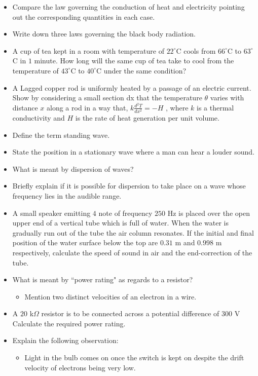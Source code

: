 \documentclass{article}
\begin{document}
\begin{itemize}
\item Compare the law governing the conduction of heat and electricity pointing out the corresponding quantities in each case.
\item Write down three laws governing the black body radiation.
\item A cup of tea kept in a room with temperature of $ 22^{\circ}$C cools from $ 66^{\circ}$C to $ 63^{\circ}$C in $ 1$ minute. How long will the same cup of tea take to cool from the temperature of $ 43^{\circ}$C to $ 40^{\circ}$C under the same condition?
\item A Lagged copper rod is uniformly heated by a passage of an electric current. Show by considering a small section dx that the temperature $ \theta $ varies with distance $ x$ along a rod in a way that, $ k\frac{d^{2}T}{dx^{2}}=-H$ , where $ k$ is a thermal conductivity and $ H$ is the rate of heat generation per unit volume.
\item Define the term standing wave.
\item State the position in a stationary wave where a man can hear a louder sound.
\item What is meant by dispersion of waves? 
\item Briefly explain if it is possible for dispersion to take place on a wave whose frequency lies in the audible range.
\item A small speaker emitting $ 4$ note of frequency $ 250$ Hz is placed over the open upper end of a vertical tube which is full of water. When the water is gradually run out of the tube the air column resonates. If the initial and final position of the water surface below the top are $ 0.31$ m and $ 0.998$ m respectively, calculate the speed of sound in air and the end-correction of the tube. 
\item What is meant by “power rating" as regards to a resistor?
 \begin{itemize}
\item Mention two distinct velocities of an electron in a wire.
\end{itemize}
\item A $ 20$ k$ \Omega$ resistor is to be connected across a potential difference of $ 300$ V Calculate the required power rating.
\item Explain the following observation:
 \begin{itemize}
\item Light in the bulb comes on once the switch is kept on despite the drift velocity of electrons being very low.

\end{itemize}
\end{itemize}
\end{document}
